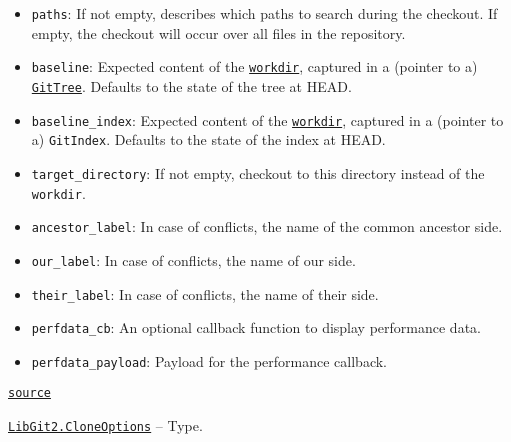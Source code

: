 \begin{adjustwidth}{2em}{0pt}
\begin{itemize}
\item \texttt{paths}: If not empty, describes which paths to search during the checkout.  If empty, the checkout will occur over all files in the repository.


\item \texttt{baseline}: Expected content of the \hyperlink{6689577338311178757}{\texttt{workdir}}, captured in a (pointer to a)  \hyperlink{6242150303858692069}{\texttt{GitTree}}. Defaults to the state of the tree at HEAD.


\item \texttt{baseline\_index}: Expected content of the \hyperlink{6689577338311178757}{\texttt{workdir}}, captured in a (pointer to a)  \texttt{GitIndex}. Defaults to the state of the index at HEAD.


\item \texttt{target\_directory}: If not empty, checkout to this directory instead of the \texttt{workdir}.


\item \texttt{ancestor\_label}: In case of conflicts, the name of the common ancestor side.


\item \texttt{our\_label}: In case of conflicts, the name of {\textquotedbl}our{\textquotedbl} side.


\item \texttt{their\_label}: In case of conflicts, the name of {\textquotedbl}their{\textquotedbl} side.


\item \texttt{perfdata\_cb}: An optional callback function to display performance data.


\item \texttt{perfdata\_payload}: Payload for the performance callback.

\end{itemize}


\href{https://github.com/JuliaLang/julia/blob/44fa15b1502a45eac76c9017af94332d4557b251/base/#L0-L32}{\texttt{source}}


\end{adjustwidth}
\hypertarget{15963609167797539123}{} 
\hyperlink{15963609167797539123}{\texttt{LibGit2.CloneOptions}}  -- {Type.}

